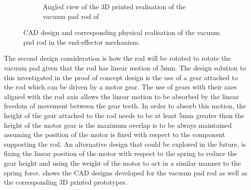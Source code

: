\begin{figure}[H]
\begin{subfigure}[b]{0.45\textwidth}
        \caption{Angled view of the 3D printed realisation of the vacuum pad rod of }
        \label{fig:vacuum-pad-rod-photo-angle}
    \end{subfigure}
    \captionsetup{singlelinecheck = false, justification=justified}
    \caption{CAD design and corresponding physical realisation of the vacuum pad rod in the end-effector mechanism.}
    \label{fig:vacuum-pad-rod}
\end{figure}

The second design consideration is how the rod will be rotated to rotate the vacuum pad given that the rod has linear motion of 5mm. The design solution to this investigated in the proof of concept design is the use of a gear attached to the rod which can be driven by a motor gear. The use of gears with their axes aligned with the rod axis allows the linear motion to be absorbed by the linear freedom of movement between the gear teeth. In order to absorb this motion, the height of the gear attached to the rod needs to be at least 5mm greater than the height of the motor gear is the maximum overlap is to be always maintained assuming the position of the motor is fixed with respect to the component supporting the rod. An alternative design that could be explored in the future, is fixing the linear position of the motor with respect to the spring to reduce the gear height and using the weight of the motor to act in a similar manner to the spring force.  shows the CAD designs developed for the vacuum pad rod as well as the corresponding 3D printed prototypes.

\pendsign